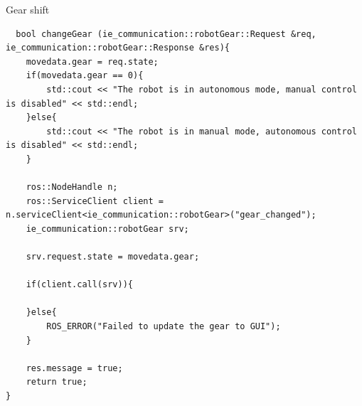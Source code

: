 \documentclass[../../main]{subfiles}
\begin{document}
  \begin{codebox}{Gear shift}
  
  
  \begin{verbatim}
  bool changeGear (ie_communication::robotGear::Request &req, ie_communication::robotGear::Response &res){
    movedata.gear = req.state;
    if(movedata.gear == 0){
        std::cout << "The robot is in autonomous mode, manual control is disabled" << std::endl;
    }else{
        std::cout << "The robot is in manual mode, autonomous control is disabled" << std::endl;
    }

    ros::NodeHandle n;
    ros::ServiceClient client = n.serviceClient<ie_communication::robotGear>("gear_changed");
    ie_communication::robotGear srv;

    srv.request.state = movedata.gear;

    if(client.call(srv)){

    }else{
        ROS_ERROR("Failed to update the gear to GUI");
    }

    res.message = true;
    return true;
}
\end{verbatim}
\end{codebox}
\end{document}
